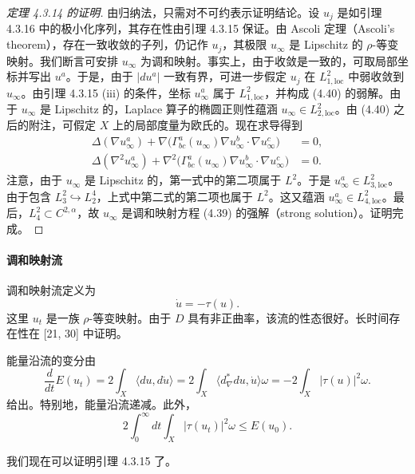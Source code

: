 \begin{proof}[定理 4.3.14 的证明]
由归纳法，只需对不可约表示证明结论。设 $u_j$ 是如引理 4.3.16 中的极小化序列，其存在性由引理 4.3.15 保证。由 Ascoli 定理（Ascoli's theorem），存在一致收敛的子列，仍记作 $u_j$，其极限 $u_\infty$ 是 Lipschitz 的 $\rho$-等变映射。我们断言可安排 $u_\infty$ 为调和映射。事实上，由于收敛是一致的，可取局部坐标并写出 $u^a$。于是，由于 $|du^a|$ 一致有界，可进一步假定 $u_j$ 在 $L^2_{1,\mathrm{loc}}$ 中弱收敛到 $u_\infty$。由引理 4.3.15 (iii) 的条件，坐标 $u^a_\infty$ 属于 $L^2_{1,\mathrm{loc}}$，并构成 (4.40) 的弱解。由于 $u_\infty$ 是 Lipschitz 的，Laplace 算子的椭圆正则性蕴涵 $u_\infty\in L^2_{2,\mathrm{loc}}$。由 (4.40) 之后的附注，可假定 $X$ 上的局部度量为欧氏的。现在求导得到
\[
\begin{aligned}
\Delta(\nabla u^a_\infty)+\nabla\bigl(\Gamma^a_{bc}(u_\infty)\nabla u^b_\infty\cdot\nabla u^c_\infty\bigr)&=0,\\
\Delta(\nabla^2u^a_\infty)+\nabla^2\bigl(\Gamma^a_{bc}(u_\infty)\nabla u^b_\infty\cdot\nabla u^c_\infty\bigr)&=0.
\end{aligned}
\]
注意，由于 $u_\infty$ 是 Lipschitz 的，第一式中的第二项属于 $L^2$。于是 $u^a_\infty\in L^2_{3,\mathrm{loc}}$。由于包含 $L^2_3\hookrightarrow L^4_2$，上式中第二式的第二项也属于 $L^2$。这又蕴涵 $u^a_\infty\in L^2_{4,\mathrm{loc}}$。最后，$L^2_4\subset C^{2,\alpha}$，故 $u_\infty$ 是调和映射方程 (4.39) 的强解（strong solution）。证明完成。
\end{proof}

\paragraph{调和映射流} 调和映射流定义为
\begin{equation}
\dot u=-\tau(u).
\label{eq:4.42}\tag{4.42}
\end{equation}
这里 $u_t$ 是一族 $\rho$-等变映射。由于 $D$ 具有非正曲率，该流的性态很好。长时间存在性在 [21, 30] 中证明。

能量沿流的变分由
\[
\frac{d}{dt}E(u_t)=2\int_X\langle du,d\dot u\rangle=2\int_X\langle d^*_\nabla du,\dot u\rangle\omega=-2\int_X|\tau(u)|^2\omega.
\]
给出。特别地，能量沿流递减。此外，
\begin{equation}
2\int_0^\infty dt\int_X|\tau(u_t)|^2\omega\le E(u_0).
\label{eq:4.43}\tag{4.43}
\end{equation}

我们现在可以证明引理 4.3.15 了。

